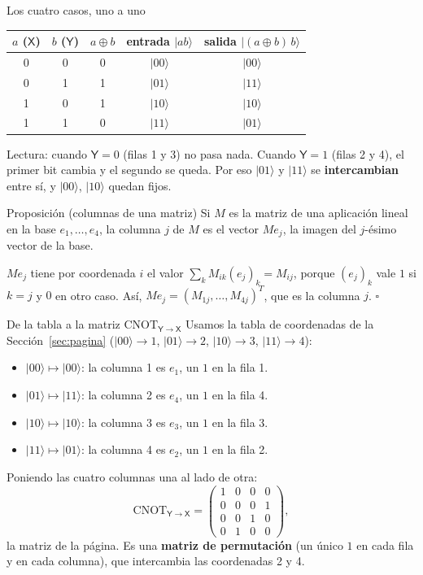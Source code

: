 \documentclass[11pt, a4paper, twoside, openright]{report}
\providecommand{\ket}[1]{|#1\rangle}
\newcommand{\X}{\mathsf{X}}
\newcommand{\Y}{\mathsf{Y}}
\newcommand{\CYX}{\mathrm{CNOT}_{\Y\to\X}}
\begin{document}
\begin{ejemplo}{Los cuatro casos, uno a uno}
\centering
\renewcommand{\arraystretch}{1.3}
\begin{tabular}{cc|c|cc}
$a$ ($\X$) & $b$ ($\Y$) & $a\oplus b$ & entrada $\ket{ab}$ & salida $\ket{(a\oplus b)\,b}$\\ \hline
0&0&0& $\ket{00}$ & $\ket{00}$\\
0&1&1& $\ket{01}$ & $\ket{11}$\\
1&0&1& $\ket{10}$ & $\ket{10}$\\
1&1&0& $\ket{11}$ & $\ket{01}$
\end{tabular}

\medskip
\raggedright
Lectura: cuando $\Y=0$ (filas 1 y 3) no pasa nada. Cuando $\Y=1$ (filas 2 y 4), el primer bit cambia y el segundo se queda. Por eso $\ket{01}$ y $\ket{11}$ se \textbf{intercambian} entre sí, y $\ket{00}$, $\ket{10}$ quedan fijos.
\end{ejemplo}

\begin{teoria}{Proposición (columnas de una matriz)}
Si $M$ es la matriz de una aplicación lineal en la base $e_1,\dots,e_4$, la columna $j$ de $M$ es el vector $Me_j$, la imagen del $j$-ésimo vector de la base.
\end{teoria}

\begin{demo}
$Me_j$ tiene por coordenada $i$ el valor $\sum_k M_{ik}(e_j)_k = M_{ij}$, porque $(e_j)_k$ vale $1$ si $k=j$ y $0$ en otro caso. Así, $Me_j=(M_{1j},\dots,M_{4j})^T$, que es la columna $j$. \hfill$\square$
\end{demo}

\begin{ejemplo}{De la tabla a la matriz $\CYX$}
Usamos la tabla de coordenadas de la Sección~\ref{sec:pagina} ($\ket{00}\to1$, $\ket{01}\to2$, $\ket{10}\to3$, $\ket{11}\to4$):
\begin{itemize}
  \item $\ket{00}\mapsto\ket{00}$: la columna 1 es $e_1$, un $1$ en la fila 1.
  \item $\ket{01}\mapsto\ket{11}$: la columna 2 es $e_4$, un $1$ en la fila 4.
  \item $\ket{10}\mapsto\ket{10}$: la columna 3 es $e_3$, un $1$ en la fila 3.
  \item $\ket{11}\mapsto\ket{01}$: la columna 4 es $e_2$, un $1$ en la fila 2.
\end{itemize}
Poniendo las cuatro columnas una al lado de otra:
\[
\CYX=\begin{pmatrix} 1&0&0&0\\0&0&0&1\\0&0&1&0\\0&1&0&0\end{pmatrix},
\]
la matriz de la página. Es una \textbf{matriz de permutación} (un único $1$ en cada fila y en cada columna), que intercambia las coordenadas 2 y 4.
\end{ejemplo}
\end{document}

